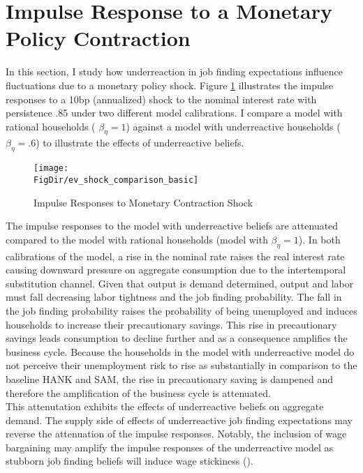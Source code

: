 \documentclass[titlepage]{\econtex}\providecommand{\texname}{Dissertation-Proposal}
\providecommand{\FigDir}{Figures}
\providecommand{\TableDir}{Tables}
\begin{document}
 
 


\hypertarget{ Impulse Response to a Monetary Policy Contraction}{}
\section{Impulse Response to a Monetary Policy Contraction }


In this section, I study how underreaction in job finding expectations influence fluctuations due to a monetary policy shock.  Figure \ref{fig:IPR_ev} illustrates the impulse responses to a 10bp (annualized) shock to the nominal interest rate with persistence .85 under two different model calibrations. I compare a model with rational households ( $\beta_{\eta} = 1$) against a model with underreactive households ($\beta_{\eta} = .6$) to illustrate the effects of underreactive beliefs. \\

\begin{figure}{}
    \centering
        \caption{Impulse Responses to Monetary Contraction Shock }
        \texttt{[image: \\FigDir/ev\_shock\_comparison\_basic]}
     \label{fig:IPR_ev}
\end{figure}


The impulse responses to the model with underreactive beliefs are attenuated compared to the model with rational households (model with $\beta_{\eta}=1$).  In both calibrations of the model, a rise in the nominal rate raises the real interest rate causing downward pressure on aggregate consumption due to the intertemporal substitution channel. Given that output is demand determined, output and labor must fall decreasing labor tightness and the job finding probability. The fall in the job finding probability raises the probability of being unemployed and induces households to increase their precautionary savings. This rise in precautionary savings leads consumption to decline further and as a consequence amplifies the business cycle. Because the households in the model with underreactive model do not perceive their unemployment risk to rise as substantially in comparison to the baseline HANK and SAM, the rise in precautionary saving is dampened and therefore the amplification of the business cycle is attenuated.\\

This attenutation exhibits the effects of underreactive beliefs on aggregate demand. The supply side of effects of underreactive job finding expectations may reverse the attenuation of the impulse responses. Notably, the inclusion of wage bargaining may amplify the impulse responses of the underreactive model as stubborn job finding beliefs will induce wage stickiness (\cite{menzio2022stubborn}). \\
\end{document}
